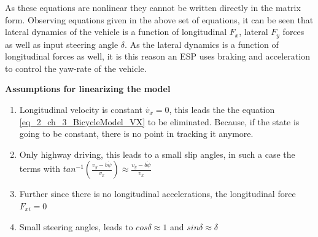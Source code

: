 As these equations are nonlinear they cannot be written directly in the matrix form. Observing equations given in the above set of equations, it can be seen that lateral dynamics of the vehicle is a function of longitudinal $F_x$, lateral $F_y$ forces as well as input steering angle $\delta$. As the lateral dynamics is a function of longitudinal forces as well, it is this reason an ESP uses braking and acceleration to control the yaw-rate of the vehicle.

\textbf{Assumptions for linearizing the model}
\begin{enumerate}
	\item Longitudinal velocity is constant $\dot{v_x} = 0$, this leads the the equation \eqref{eq_2_ch_3_BicycleModel_VX} to be eliminated. Because, if the state is going to be constant, there is no point in tracking it anymore.
	\item Only highway driving, this leads to a small slip angles, in such a case the terms with $tan^{-1}\left(\frac{v_y - b \dot{\psi}}{v_x}\right) \approx \frac{v_y - b \dot{\psi}}{v_x}$
	\item Further since there is no longitudinal accelerations, the longitudinal force $F_{xi} = 0$
	\item Small steering angles, leads to $cos\delta \approx 1$ and $sin\delta \approx \delta$
\end{enumerate}

